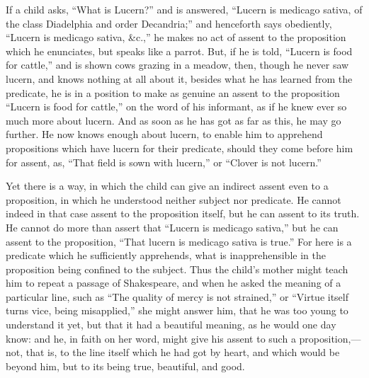 If a child asks, ``What is Lucern?'' and is answered,
``Lucern is medicago sativa, of the class Diadelphia and order
Decandria;'' and henceforth says obediently, ``Lucern is
medicago sativa, \&c.,'' he makes no act of assent to the
proposition which he enunciates, but speaks like a parrot. But, if he
is told, ``Lucern is food for cattle,'' and is shown cows
grazing in a meadow, then, though he never saw lucern, and knows
nothing at all about it, besides what he has learned from the
predicate, he is in a position to make as genuine an assent to the
proposition ``Lucern is food for cattle,'' on the word of his
informant, as if he knew ever so much more about lucern. And as soon
as he has got as far as this, he may go further. He now knows enough
about lucern, to enable him to apprehend propositions which have
lucern for their predicate, should they come before him for assent,
as, ``That field is sown with lucern,'' or ``Clover is not
lucern.''

Yet there is a way, in which the child can give an indirect assent
even to a proposition, in which he understood neither subject nor
predicate. He cannot indeed in that case assent to the proposition
itself, but he can assent to its truth. He cannot do more than assert
that ``Lucern is medicago sativa,'' but he can assent to the
proposition, ``That lucern is medicago sativa is true.'' For
here is a predicate which he sufficiently apprehends, what is
inapprehensible in the proposition being confined to the subject. Thus
the child's mother might teach him to repeat a passage of Shakespeare,
and when he asked the meaning of a particular line, such as ``The
quality of mercy is not strained,'' or ``Virtue itself turns vice, being misapplied,'' she might answer him, that he was
too young to understand it yet, but that it had a beautiful meaning,
as he would one day know: and he, in faith on her word, might give his
assent to such a proposition,—not, that is, to the line itself which
he had got by heart, and which would be beyond him, but to its being
true, beautiful, and good.

